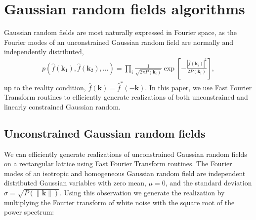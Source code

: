 \documentclass[a4paper, 11pt]{article}
\begin{document}


% 



\appendix
\section{Gaussian random fields algorithms}\label{ap:GRF}
Gaussian random fields are most naturally expressed in Fourier space, as the Fourier modes of an unconstrained Gaussian random field are normally and independently distributed, 
\begin{align}
p(\hat{f}(\bm{k}_1), \hat{f}(\bm{k}_2), \dots) = \prod_{i} \frac{1}{\sqrt{2\pi P(\bm{k}_i)}} \exp\left[-\frac{|\hat{f}(\bm{k}_i)|^2}{2P(\bm{k}_i)}\right],
\end{align}
up to the reality condition, $\hat{f}(\bm{k})=\hat{f}^*(-\bm{k})$. In this paper, we use Fast Fourier Transform routines to efficiently generate realizations of both unconstrained and linearly constrained Gaussian random.

\subsection{Unconstrained Gaussian random fields}
We can efficiently generate realizations of unconstrained Gaussian random fields on a rectangular lattice using Fast Fourier Transform routines. The Fourier modes of an isotropic and homogeneous Gaussian random field are independent distributed Gaussian variables with zero mean, $\mu=0$, and the standard deviation $\sigma = \sqrt{P(\|\bm{k}\|)}$. Using this observation we generate the realization by multiplying the Fourier transform of white noise with the square root of the power spectrum:\\
\end{document}
